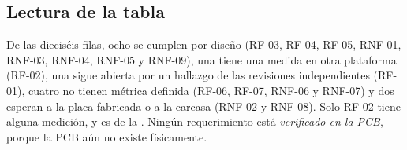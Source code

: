 \subsection{Lectura de la tabla}

De las dieciséis filas, ocho se cumplen por diseño (RF-03, RF-04, RF-05, RNF-01, RNF-03, RNF-04, RNF-05 y RNF-09), una
tiene una medida en otra plataforma (RF-02), una sigue abierta por un hallazgo de las revisiones
independientes (RF-01), cuatro no tienen métrica definida (RF-06, RF-07, RNF-06 y RNF-07) y dos
esperan a la placa fabricada o a la carcasa (RNF-02 y RNF-08). Solo RF-02 tiene alguna medición, y es de
la \pBoard{}. Ningún requerimiento está \emph{verificado en la PCB}, porque la PCB aún no existe
físicamente.

